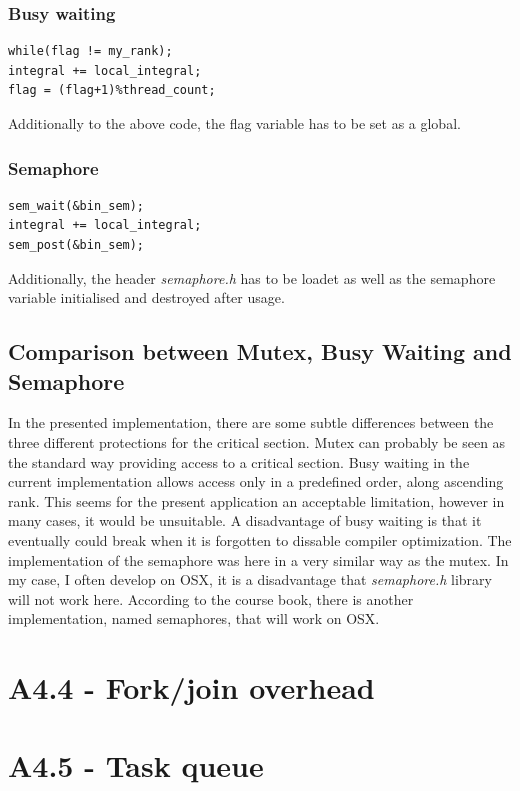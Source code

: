 \documentclass[a4paper,11pt,twoside]{article}
\begin{document}
\subsubsection{Busy waiting}
\begin{verbatim}
while(flag != my_rank);
integral += local_integral;
flag = (flag+1)%thread_count;
\end{verbatim}
Additionally to the above code, the flag variable has to be set as a global.

\subsubsection{Semaphore}
\begin{verbatim}
sem_wait(&bin_sem);
integral += local_integral;
sem_post(&bin_sem);
\end{verbatim}
Additionally, the header \textit{semaphore.h} has to be loadet as well as the semaphore variable initialised and destroyed after usage.

\subsection{Comparison between Mutex, Busy Waiting and Semaphore}
In the presented implementation, there are some subtle differences between the three different protections for the critical section. Mutex can probably be seen as the standard way providing access to a critical section. Busy waiting in the current implementation allows access only in a predefined order, along ascending rank. This seems for the present application an acceptable limitation, however in many cases, it would be unsuitable. A disadvantage of busy waiting is that it eventually could break when it is forgotten to dissable compiler optimization. The implementation of the semaphore was here in a very similar way as the mutex. In my case, I often develop on OSX, it is a disadvantage that \textit{semaphore.h} library will not work here. According to the course book, there is another implementation, named semaphores, that will work on OSX.  

\section{A4.4 - Fork/join overhead}

\section{A4.5 - Task queue} 
\end{document}
